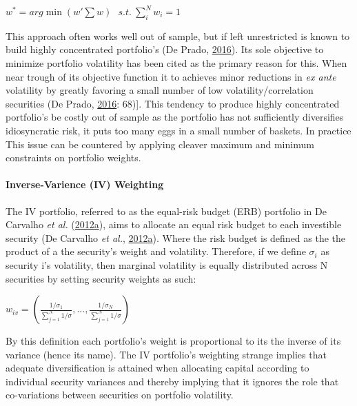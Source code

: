 \documentclass[11pt,preprint, authoryear]{elsarticle}
\numberwithin{equation}{section}
\numberwithin{figure}{section}
\numberwithin{table}{section}
\begin{document}
\begin{center}
$w^*=arg\min(w'\sum w)\ \ \ s.t.\ \sum^N_iw_i=1$ 
\end{center}

This approach often works well out of sample, but if left unrestricted
is known to build highly concentrated portfolio's (De Prado,
\protect\hyperlink{ref-lopez}{2016}). Its sole objective to minimize
portfolio volatility has been cited as the primary reason for this. When
near trough of its objective function it to achieves minor reductions in
\emph{ex ante} volatility by greatly favoring a small number of low
volatility/correlation securities (De Prado,
\protect\hyperlink{ref-lopez}{2016}: 68){]}. This tendency to produce
highly concentrated portfolio's be costly out of sample as the portfolio
has not sufficiently diversifies idiosyncratic risk, it puts too many
eggs in a small number of baskets. In practice This issue can be
countered by applying cleaver maximum and minimum constraints on
portfolio weights.

\hypertarget{inverse-varience-iv-weighting}{%
\paragraph{Inverse-Varience (IV)
Weighting}\label{inverse-varience-iv-weighting}}

The IV portfolio, referred to as the equal-risk budget (ERB) portfolio
in De Carvalho \emph{et al.}
(\protect\hyperlink{ref-leote}{2012}\protect\hyperlink{ref-leote}{a}),
aims to allocate an equal risk budget to each investible security (De
Carvalho \emph{et al.},
\protect\hyperlink{ref-leote}{2012}\protect\hyperlink{ref-leote}{a}).
Where the risk budget is defined as the the product of a the security's
weight and volatility. Therefore, if we define \(\sigma_i\) as security
i's volatility, then marginal volatility is equally distributed across N
securities by setting security weights as such:

\begin{center} 
$w_{iv}=(\frac{1/\sigma_1}{\sum^N_{j=1} 1/\sigma}, ...,\frac{1/\sigma_N}{\sum^N_{j=1} 1/\sigma} )$ 
\end{center}

By this definition each portfolio's weight is proportional to its the
inverse of its variance (hence its name). The IV portfolio's weighting
strange implies that adequate diversification is attained when
allocating capital according to individual security variances and
thereby implying that it ignores the role that co-variations between
securities on portfolio volatility.
\end{document}
